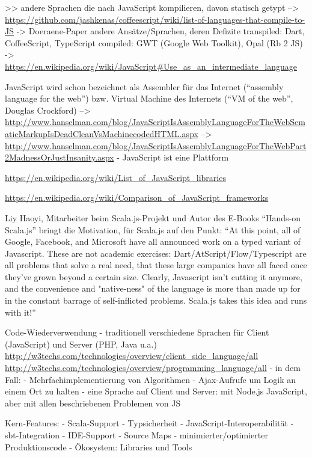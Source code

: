 \documentclass[a4paper, 12pt, hidelinks, listof=totoc, listoftables=totoc, bibliography=totoc]{scrreprt}
\begin{document}
>> andere Sprachen die nach JavaScript kompilieren, davon statisch getypt  -->  \url{https://github.com/jashkenas/coffeescript/wiki/list-of-languages-that-compile-to-JS}
-> Doeraene-Paper
andere Ansätze/Sprachen, deren Defizite
 transpiled:
   Dart, CoffeeScript, TypeScript
 compiled:
   GWT (Google Web Toolkit), Opal (Rb 2 JS)
-> \url{https://en.wikipedia.org/wiki/JavaScript#Use_as_an_intermediate_language}

JavaScript wird schon bezeichnet als Assembler für das Internet ("`assembly language for the web"') bzw. Virtual Machine des Internets ("`VM of the web"', Douglas Crockford)
  -->  \url{http://www.hanselman.com/blog/JavaScriptIsAssemblyLanguageForTheWebSematicMarkupIsDeadCleanVsMachinecodedHTML.aspx}
  --> \url{http://www.hanselman.com/blog/JavaScriptIsAssemblyLanguageForTheWebPart2MadnessOrJustInsanity.aspx}
  - JavaScript ist eine Plattform\cite{doeraene2015.SSP}


\url{https://en.wikipedia.org/wiki/List_of_JavaScript_libraries}

\url{https://en.wikipedia.org/wiki/Comparison_of_JavaScript_frameworks}


Liy Haoyi, Mitarbeiter beim Scala.js-Projekt und Autor des E-Books "`Hands-on Scala.js"' bringt die Motivation, für Scala.js auf den Punkt: "`At this point, all of Google, Facebook, and Microsoft have all announced work on a typed variant of Javascript. These are not academic exercises: Dart/AtScript/Flow/Typescript are all problems that solve a real need, that these large companies have all faced once they've grown beyond a certain size. Clearly, Javascript isn't cutting it anymore, and the convenience and "native-ness" of the language is more than made up for in the constant barrage of self-inflicted problems. Scala.js takes this idea and runs with it!"'\cite[\#TheLanguage]{haoyi.HOS}


Code-Wiederverwendung
- traditionell verschiedene Sprachen für Client (JavaScript) und Server (PHP, Java u.a.)
	\url{http://w3techs.com/technologies/overview/client_side_language/all}
	\url{http://w3techs.com/technologies/overview/programming_language/all}
	- in dem Fall:
		- Mehrfachimplementierung von Algorithmen
		- Ajax-Aufrufe um Logik an einem Ort zu halten
- eine Sprache auf Client und Server: mit Node.js JavaScript, aber mit allen beschriebenen Problemen von JS




Kern-Features:
- Scala-Support
- Typsicherheit
- JavaScript-Interoperabilität
- sbt-Integration
- IDE-Support
- Source Maps
- minimierter/optimierter Produktionscode
- Ökosystem: Libraries und Tools
\end{document}

